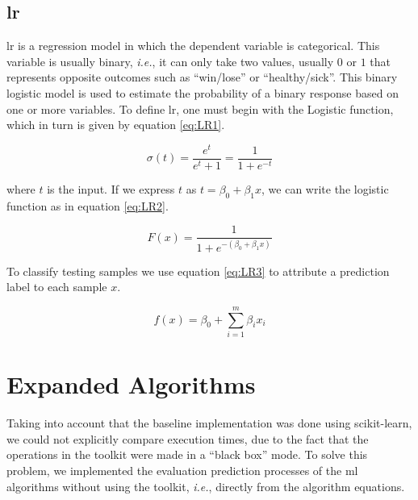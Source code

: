 \subsection{\acl{lr}}
\label{ssec:LogisticRegression}


\ac{lr} is a regression model in which the dependent variable is categorical. This variable is usually binary, \textit{i.e.}, it can only take two values, usually $0$ or $1$ that represents opposite outcomes such as ``win/lose'' or ``healthy/sick''.
This binary logistic model is used to estimate the probability of a binary response based on one or more variables.
To define \ac{lr}, one must begin with the Logistic function, which in turn is given by equation \ref{eq:LR1}.

\begin{equation}
\label{eq:LR1}
\sigma (t)={\frac {e^{t}}{e^{t}+1}}={\frac {1}{1+e^{-t}}}
\end{equation}

where $t$ is the input. If we express $t$ as $t=\beta _{0}+\beta _{1}x$, we can write the logistic function as in equation \ref{eq:LR2}.

\begin{equation}
\label{eq:LR2}
F(x)={\frac {1}{1+e^{-(\beta _{0}+\beta _{1}x)}}}
\end{equation}


To classify testing samples we use equation \ref{eq:LR3} to attribute a prediction label to each sample $x$.

\begin{equation}
\label{eq:LR3}
f(x)=\beta_0+\sum_{i=1}^m \beta_i x_i
\end{equation}

\section{Expanded Algorithms}
\label{sec:ExpandedAlgorithmsImplementation}



Taking into account that the baseline implementation was done using scikit-learn, we could not explicitly compare execution times, due to the fact that the operations in the toolkit were made in a ``black box'' mode. To solve this problem, we implemented the evaluation prediction processes of the \ac{ml} algorithms without using the toolkit, \textit{i.e.}, directly from the algorithm equations.

